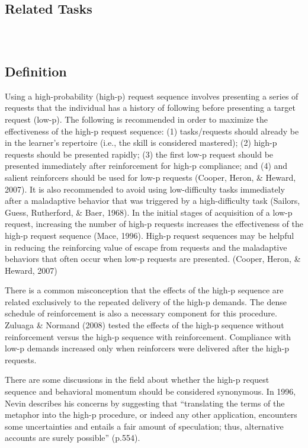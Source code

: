 \subsection{Related Tasks}
\fouraFourteen{}\\
%
%
%
%
%
\section{\foureNine{}}
\subsection{Definition}
Using a high-probability (high-p) request sequence involves presenting a series of requests that the individual has a history of following before presenting a target request (low-p).  The following is recommended in order to maximize the effectiveness of the high-p request sequence: (1) tasks/requests should already be in the learner's repertoire (i.e., the skill is considered mastered); (2) high-p requests should be presented rapidly; (3) the first low-p request should be presented immediately after reinforcement for high-p compliance; and (4) and salient reinforcers should be used for low-p requests (Cooper, Heron, \& Heward, 2007).  It is also recommended to avoid using low-difficulty tasks immediately after a maladaptive behavior that was triggered by a high-difficulty task (Sailors, Guess, Rutherford, \& Baer, 1968).  In the initial stages of acquisition of a low-p request, increasing the number of high-p requests increases the effectiveness of the high-p request sequence (Mace, 1996).  High-p request sequences may be helpful in reducing the reinforcing value of escape from requests and the maladaptive behaviors that often occur when low-p requests are presented. (Cooper, Heron, \& Heward, 2007)

There is a common misconception that the effects of the high-p sequence are related exclusively to the repeated delivery of the high-p demands. The dense schedule of reinforcement is also a necessary component for this procedure. Zuluaga \& Normand (2008) tested the effects of the high-p sequence without reinforcement versus the high-p sequence with reinforcement. Compliance with low-p demands increased only when reinforcers were delivered after the high-p requests.

There are some discussions in the field about whether the high-p request sequence and behavioral momentum should be considered synonymous. In 1996, Nevin describes his concerns by suggesting that ``translating the terms of the metaphor into the high-p procedure, or indeed any other application, encounters some uncertainties and entails a fair amount of speculation; thus, alternative accounts are surely possible'' (p.554).
